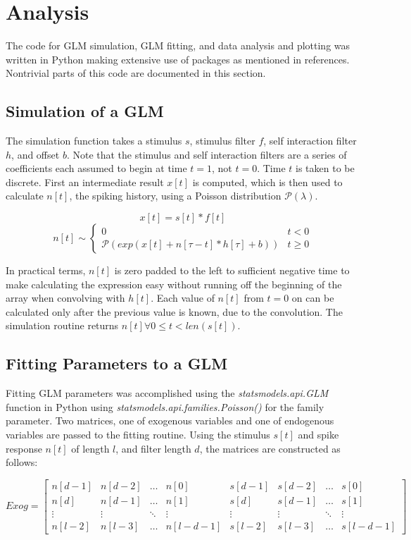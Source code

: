 \documentclass[letterpaper,titlepage,10pt]{article}
\begin{document}
\section{Analysis}

The code for GLM simulation, GLM fitting, and data analysis and plotting was written in Python making extensive use
of packages as mentioned in references. Nontrivial parts of this code are documented in this section.

\subsection{Simulation of a GLM}

The simulation function takes a stimulus $s$, stimulus filter $f$, self interaction filter $h$, and offset $b$. Note
that the stimulus and self interaction filters are a series of coefficients each assumed to begin at time $t=1$, not
$t=0$. Time $t$ is taken to be discrete. First an intermediate result $x[t]$ is computed, which is then used to
calculate $n[t]$, the spiking history, using a Poisson distribution $\mathcal{P}(\lambda)$.

$$x[t]=s[t]*f[t]$$
$$n[t]\sim
\begin{cases}
0 & t < 0\\
\mathcal{P}(exp(x[t]+n[\tau-t]*h[\tau]+b)) & t \geq 0
\end{cases}$$

In practical terms, $n[t]$ is zero padded to the left to sufficient negative time to make calculating the expression
easy without running off the beginning of the array when convolving with $h[t]$. Each value of $n[t]$ from $t=0$ on
can be calculated only after the previous value is known, due to the convolution. The simulation routine returns
$n[t] \forall 0 \leq t < len(s[t])$.

\subsection{Fitting Parameters to a GLM}

Fitting GLM parameters was accomplished using the \textit{statsmodels.api.GLM} function in
Python using \textit{statsmodels.api.families.Poisson()} for the family parameter. Two
matrices, one of exogenous variables and one of endogenous variables are passed to the fitting routine. Using the
stimulus $s[t]$ and spike response $n[t]$ of length $l$, and filter length $d$, the matrices are constructed as
follows:

$$Exog=
\begin{bmatrix}
n[d-1] & n[d-2] & \hdots & n[0] & s[d-1] & s[d-2] & \hdots & s[0] \\
n[d] & n[d-1] & \hdots & n[1] & s[d] & s[d-1] & \hdots & s[1] \\
\vdots & \vdots & \ddots & \vdots & \vdots & \vdots & \ddots & \vdots \\
n[l-2] & n[l-3] & \hdots & n[l-d-1] & s[l-2] & s[l-3] & \hdots & s[l-d-1]
\end{bmatrix}$$
\end{document}
